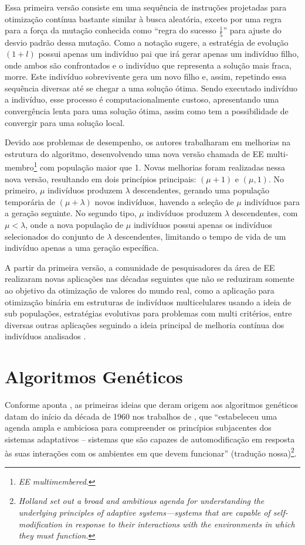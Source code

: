 Essa primeira versão consiste em uma sequência de instruções projetadas para otimização contínua bastante similar à busca aleatória, exceto por uma regra para a força da mutação conhecida como \enquote{regra do sucesso $\frac{1}{5}$} para ajuste do desvio padrão dessa mutação. Como a notação sugere, a estratégia de evolução $(1 + l)$ possui apenas um indivíduo pai que irá gerar apenas um indivíduo filho, onde ambos são confrontados e o indivíduo que representa a solução mais fraca, morre. Este indivíduo sobrevivente gera um novo filho e, assim, repetindo essa sequência diversas até se chegar a uma solução ótima. Sendo executado indivíduo a indivíduo, esse processo é computacionalmente custoso, apresentando uma convergência lenta para uma solução ótima, assim como tem a possibilidade de convergir para uma solução local.

Devido aos problemas de desempenho, os autores trabalharam em melhorias na estrutura do algoritmo, desenvolvendo uma nova versão chamada de EE multi-membro\footnote{\textit{EE multimembered}.} com população maior que 1. Novas melhorias foram realizadas nessa nova versão, resultando em dois princípios principais: $(\mu+1)$ e $(\mu, 1)$. No primeiro, $\mu$ indivíduos produzem $\lambda$ descendentes, gerando uma população temporária de $(\mu + \lambda)$ novos indivíduos, havendo a seleção de $\mu$ indivíduos para a geração seguinte. No segundo tipo, $\mu$ indivíduos produzem $\lambda$ descendentes, com $\mu < \lambda$, onde a nova população de $\mu$ indivíduos possui apenas os indivíduos selecionados do conjunto de $\lambda$ descendentes, limitando o tempo de vida de um indivíduo apenas a uma geração específica.

A partir da primeira versão, a comunidade de pesquisadores da área de EE realizaram novas aplicações nas décadas seguintes que não se reduziram somente ao objetivo da otimização de valores do mundo real, como a aplicação para otimização binária em estruturas de indivíduos multicelulares usando a ideia de sub populações, estratégias evolutivas para problemas com multi critérios, entre diversas outras aplicações seguindo a ideia principal de melhoria contínua dos indivíduos analisados .

\section{Algoritmos Genéticos} 

Conforme aponta \cite[pg.A2.3:4]{back_handbook_1997}, as primeiras ideias que deram origem aos algoritmos genéticos datam do início da década de 1960 nos trabalhos de \cite{holland_1962}, que \enquote{estabeleceu uma agenda ampla e ambiciosa para compreender os princípios subjacentes dos sistemas adaptativos – sistemas que são capazes de automodificação em resposta às suas interações com os ambientes em que devem funcionar} (tradução nossa)\footnote{\textit{Holland set out a broad and ambitious agenda for understanding the underlying principles of adaptive systems—systems that are capable of self-modification in response to their interactions with the environments in which they must function.}}.

